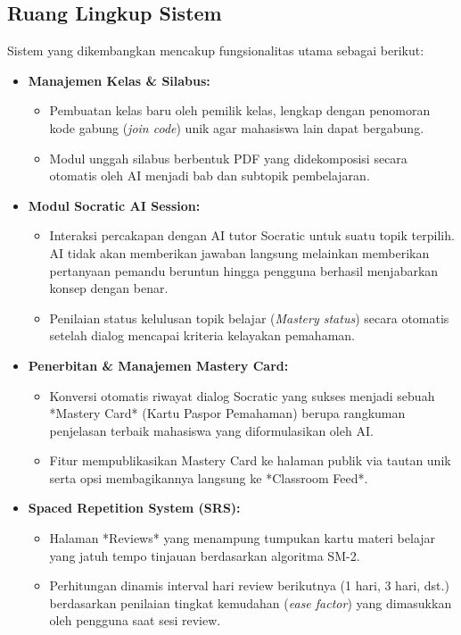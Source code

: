 \documentclass[12pt,a4paper]{article}
\begin{document}
\subsection{Ruang Lingkup Sistem}
Sistem yang dikembangkan mencakup fungsionalitas utama sebagai berikut:
\begin{itemize}
    \item \textbf{Manajemen Kelas \& Silabus:}
    \begin{itemize}
        \item Pembuatan kelas baru oleh pemilik kelas, lengkap dengan penomoran kode gabung (\textit{join code}) unik agar mahasiswa lain dapat bergabung.
        \item Modul unggah silabus berbentuk PDF yang didekomposisi secara otomatis oleh AI menjadi bab dan subtopik pembelajaran.
    \end{itemize}
    \item \textbf{Modul Socratic AI Session:}
    \begin{itemize}
        \item Interaksi percakapan dengan AI tutor Socratic untuk suatu topik terpilih. AI tidak akan memberikan jawaban langsung melainkan memberikan pertanyaan pemandu beruntun hingga pengguna berhasil menjabarkan konsep dengan benar.
        \item Penilaian status kelulusan topik belajar (\textit{Mastery status}) secara otomatis setelah dialog mencapai kriteria kelayakan pemahaman.
    \end{itemize}
    \item \textbf{Penerbitan \& Manajemen Mastery Card:}
    \begin{itemize}
        \item Konversi otomatis riwayat dialog Socratic yang sukses menjadi sebuah *Mastery Card* (Kartu Paspor Pemahaman) berupa rangkuman penjelasan terbaik mahasiswa yang diformulasikan oleh AI.
        \item Fitur mempublikasikan Mastery Card ke halaman publik via tautan unik serta opsi membagikannya langsung ke *Classroom Feed*.
    \end{itemize}
    \item \textbf{Spaced Repetition System (SRS):}
    \begin{itemize}
        \item Halaman *Reviews* yang menampung tumpukan kartu materi belajar yang jatuh tempo tinjauan berdasarkan algoritma SM-2.
        \item Perhitungan dinamis interval hari review berikutnya (1 hari, 3 hari, dst.) berdasarkan penilaian tingkat kemudahan (\textit{ease factor}) yang dimasukkan oleh pengguna saat sesi review.

\end{itemize}
\end{itemize}
\end{document}
